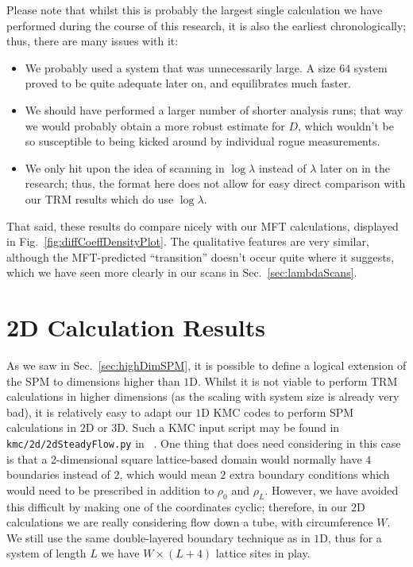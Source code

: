 Please note that whilst this is probably the largest single calculation we have performed during the 
course of this research, it is also the earliest chronologically; thus, there are many issues
with it:
\begin{itemize}
 \item We probably used a system that was unnecessarily large. A size $64$ system proved to be quite adequate
 later on, and equilibrates much faster.
 \item We should have performed a larger number of shorter analysis runs; that way we would
 probably obtain a more robust estimate for $D$, which wouldn't be so susceptible to being
 kicked around by individual rogue measurements.
 \item We only hit upon the idea of scanning in $\log \lambda$ instead of $\lambda$ later on
 in the research; thus, the format here does not allow for easy direct comparison with our TRM
 results which do use $\log \lambda$. 
\end{itemize}
That said, these results do compare nicely with our MFT calculations, displayed in 
Fig.~\ref{fig:diffCoeffDensityPlot}. The qualitative features are very similar, although the
MFT-predicted ``transition'' doesn't occur quite where it suggests, which we have seen  
more clearly in our scans in Sec.~\ref{sec:lambdaScans}.

\section{2D Calculation Results}
As we saw in Sec.~\ref{sec:highDimSPM}, it is possible to define a logical extension of the SPM
to dimensions higher than $1$D. Whilst it is not viable to perform TRM calculations in higher 
dimensions (as the scaling with system size is already very bad), it is relatively easy to adapt
our $1$D KMC codes to perform SPM calculations in $2$D or $3$D. Such a KMC input script may be found
in \texttt{kmc/2d/2dSteadyFlow.py} in ~\cite{hellier2019a}.
One thing that does need considering in this case is that a 2-dimensional square
lattice-based domain would normally have $4$ boundaries instead of $2$, which would mean $2$ extra
boundary conditions which would need to be prescribed in addition to $\rho_0$ and $\rho_L$.
However, we have avoided this difficult by making one of the coordinates cyclic; therefore, in our
$2$D calculations we are really considering flow down a tube, with circumference $W$. We still
use the same double-layered boundary technique as in $1$D, thus for a system of length $L$
we have $W \times (L+4)$ lattice sites in play.

